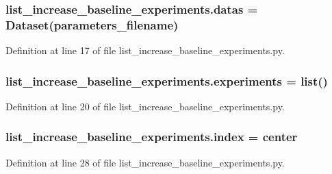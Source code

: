 \subsubsection[{\texorpdfstring{datas}{datas}}]{\setlength{\rightskip}{0pt plus 5cm}list\+\_\+increase\+\_\+baseline\+\_\+experiments.\+datas = {\bf Dataset}({\bf parameters\+\_\+filename})}\hypertarget{namespacelist__increase__baseline__experiments_a2d9ca79006c2dc27d8ef72a04d6548ba}{}\label{namespacelist__increase__baseline__experiments_a2d9ca79006c2dc27d8ef72a04d6548ba}


Definition at line 17 of file list\+\_\+increase\+\_\+baseline\+\_\+experiments.\+py.

\subsubsection[{\texorpdfstring{experiments}{experiments}}]{\setlength{\rightskip}{0pt plus 5cm}list\+\_\+increase\+\_\+baseline\+\_\+experiments.\+experiments = list()}\hypertarget{namespacelist__increase__baseline__experiments_a4dabc376138c4323f09d61e391557377}{}\label{namespacelist__increase__baseline__experiments_a4dabc376138c4323f09d61e391557377}


Definition at line 20 of file list\+\_\+increase\+\_\+baseline\+\_\+experiments.\+py.

\subsubsection[{\texorpdfstring{index}{index}}]{\setlength{\rightskip}{0pt plus 5cm}list\+\_\+increase\+\_\+baseline\+\_\+experiments.\+index = {\bf center}}\hypertarget{namespacelist__increase__baseline__experiments_a9fb7aca9b2bd8442265f1658f525b0a6}{}\label{namespacelist__increase__baseline__experiments_a9fb7aca9b2bd8442265f1658f525b0a6}


Definition at line 28 of file list\+\_\+increase\+\_\+baseline\+\_\+experiments.\+py.

